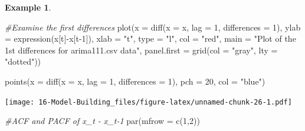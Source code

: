 \documentclass[
]{book}
\newenvironment{Shaded}{\begin{snugshade}}{\end{snugshade}}
\newcommand{\AttributeTok}[1]{\textcolor[rgb]{0.77,0.63,0.00}{#1}}
\newcommand{\CommentTok}[1]{\textcolor[rgb]{0.56,0.35,0.01}{\textit{#1}}}
\newcommand{\DecValTok}[1]{\textcolor[rgb]{0.00,0.00,0.81}{#1}}
\newcommand{\FunctionTok}[1]{\textcolor[rgb]{0.00,0.00,0.00}{#1}}
\newcommand{\NormalTok}[1]{#1}
\newcommand{\OtherTok}[1]{\textcolor[rgb]{0.56,0.35,0.01}{#1}}
\newcommand{\SpecialCharTok}[1]{\textcolor[rgb]{0.00,0.00,0.00}{#1}}
\newcommand{\StringTok}[1]{\textcolor[rgb]{0.31,0.60,0.02}{#1}}
\theoremstyle{definition}
\theoremstyle{definition}
\newtheorem{example}{Example}[chapter]
\theoremstyle{definition}
\theoremstyle{definition}
\theoremstyle{remark}
\begin{document}
\begin{example}
\begin{Shaded}
\begin{Highlighting}[]
\CommentTok{\#Examine the first differences}
\FunctionTok{plot}\NormalTok{(}\AttributeTok{x =} \FunctionTok{diff}\NormalTok{(}\AttributeTok{x =}\NormalTok{ x, }\AttributeTok{lag =} \DecValTok{1}\NormalTok{, }\AttributeTok{differences =} \DecValTok{1}\NormalTok{), }\AttributeTok{ylab =} 
    \FunctionTok{expression}\NormalTok{(x[t]}\SpecialCharTok{{-}}\NormalTok{x[t}\DecValTok{{-}1}\NormalTok{]), }\AttributeTok{xlab =} \StringTok{"t"}\NormalTok{, }\AttributeTok{type =} \StringTok{"l"}\NormalTok{, col }
    \OtherTok{=} \StringTok{"red"}\NormalTok{,  }\AttributeTok{main =} \StringTok{"Plot of the 1st differences for }
\StringTok{    arima111.csv data"}\NormalTok{, }\AttributeTok{panel.first =} \FunctionTok{grid}\NormalTok{(}\AttributeTok{col =} \StringTok{"gray"}\NormalTok{, }
    \AttributeTok{lty =} \StringTok{"dotted"}\NormalTok{))}

\FunctionTok{points}\NormalTok{(}\AttributeTok{x =} \FunctionTok{diff}\NormalTok{(}\AttributeTok{x =}\NormalTok{ x, }\AttributeTok{lag =} \DecValTok{1}\NormalTok{, }\AttributeTok{differences =} \DecValTok{1}\NormalTok{), }\AttributeTok{pch =} 
    \DecValTok{20}\NormalTok{, }\AttributeTok{col =} \StringTok{"blue"}\NormalTok{)}
\end{Highlighting}
\end{Shaded}

\texttt{[image: 16-Model-Building\_files/figure-latex/unnamed-chunk-26-1.pdf]}

\begin{Shaded}
\begin{Highlighting}[]
\CommentTok{\#ACF and PACF of x\_t {-} x\_t{-}1}
\FunctionTok{par}\NormalTok{(}\AttributeTok{mfrow =} \FunctionTok{c}\NormalTok{(}\DecValTok{1}\NormalTok{,}\DecValTok{2}\NormalTok{))}


\end{Highlighting}
\end{Shaded}
\end{example}
\end{document}
